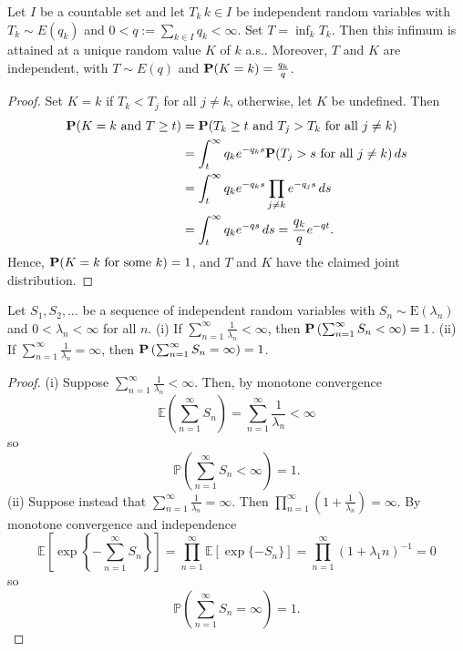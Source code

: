 \begin{theorem}[infimum]
    Let $I$ be a countable set and let $T_k\,k\in I$ be independent random variables with $T_k \sim E(q_k)$ and $0 < q := \sum_{k\in I} q_k < \infty$. 
    Set $T = \inf_k T_k$. Then this infimum is attained at a unique random value $K$ of $k$ a.s.. Moreover, $T$ and $K$ are independent, with $T \sim E(q)$ and $\mathbf{P}(K = k) = \frac{q_k}{q}$.

\end{theorem}
\begin{proof}
    Set \(K = k\) if \(T_k < T_j\) for all \(j \neq k\), otherwise, let \(K\) be undefined. Then
\[
\begin{aligned}
\mathbf{P}(K = k \text{ and } T \geq t) &= \mathbf{P}(T_k \geq t \text{ and } T_j > T_k \text{ for all } j \neq k) \\
&= \int_{t}^{\infty} q_k e^{-q_k s} \mathbf{P}(T_j > s \text{ for all } j \neq k) \, ds \\
&= \int_{t}^{\infty} q_k e^{-q_k s} \prod_{j \neq k} e^{-q_j s} \, ds \\
&= \int_{t}^{\infty} q_k e^{-qs} \, ds = \frac{q_k}{q} e^{-qt}.
\end{aligned}
\]
Hence, \(\mathbf{P}(K = k \text{ for some } k) = 1\), and \(T\) and \(K\) have the claimed joint distribution.

\end{proof}

\begin{theorem}
    Let \(S_1, S_2, \ldots\) be a sequence of independent random variables with \(S_n \sim \text{E}(\lambda_n)\) and \(0 < \lambda_n < \infty\) for all \(n\).\newline 
    (i) If \(\sum_{n=1}^{\infty} \frac{1}{\lambda_n} < \infty\), then \(\mathbf{P} \left(\sum_{n=1}^{\infty} S_n < \infty\right) = 1\).\newline
    (ii) If \(\sum_{n=1}^{\infty} \frac{1}{\lambda_n} = \infty\), then \(\mathbf{P} \left(\sum_{n=1}^{\infty} S_n = \infty\right) = 1\).
    
\end{theorem}
\begin{proof}
    (i) Suppose \(\sum_{n=1}^{\infty} \frac{1}{\lambda_n} < \infty\). Then, by monotone convergence
\[
\mathbb{E} \left( \sum_{n=1}^{\infty} S_n \right) = \sum_{n=1}^{\infty} \frac{1}{\lambda_n} < \infty
\]
so
\[
\mathbb{P} \left( \sum_{n=1}^{\infty} S_n < \infty \right) = 1.
\]
(ii) Suppose instead that \(\sum_{n=1}^{\infty} \frac{1}{\lambda_n} = \infty\). Then \(\prod_{n=1}^{\infty} (1 + \frac{1}{\lambda_n}) = \infty\).
By monotone convergence and independence
\[
\mathbb{E} \left[ \exp\left\{- \sum_{n=1}^{\infty} S_n \right\} \right] = \prod_{n=1}^{\infty} \mathbb{E} \left[ \exp\{-S_n\} \right] = \prod_{n=1}^{\infty} (1 + \lambda_1 n)^{-1} = 0
\]
so
\[
\mathbb{P} \left( \sum_{n=1}^{\infty} S_n = \infty \right) = 1.
\]

\end{proof}

